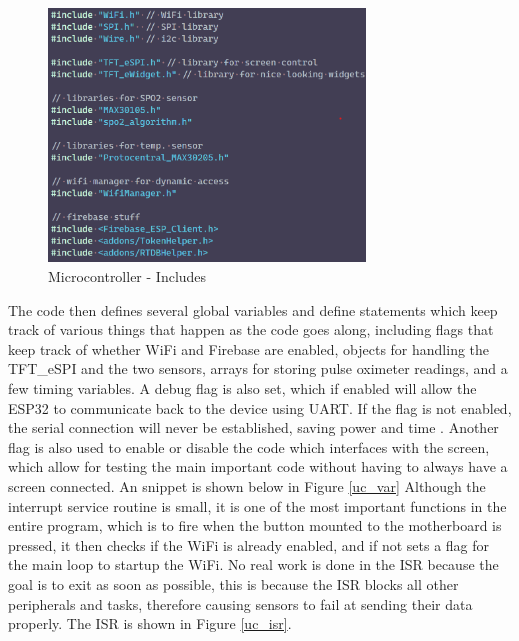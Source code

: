 \documentclass[12pt]{article}
\begin{document}
    \begin{figure}[ht]
        \centering
        \includegraphics[width=0.75\textwidth]{uc_libs}
        \caption{Microcontroller - Includes}
        \label{uc_lib}
    \end{figure} 

    The code then defines several global variables and define statements which keep track of various things that happen as the code goes along, including flags that keep track of whether WiFi and Firebase are enabled, objects for handling the TFT\_eSPI and the two sensors, arrays for storing pulse oximeter readings, and a few timing variables. A debug flag is also set, which if enabled will allow the ESP32 to communicate back to the device using UART. If the flag is not enabled, the serial connection will never be established, saving power and time \cite{esp32}. Another flag is also used to enable or disable the code which interfaces with the screen, which allow for testing the main important code without having to always have a screen connected. An snippet is shown below in Figure \ref{uc_var} Although the interrupt service routine is small, it is one of the most important functions in the entire program, which is to fire when the button mounted to the motherboard is pressed, it then checks if the WiFi is already enabled, and if not sets a flag for the main loop to startup the WiFi. No real work is done in the ISR because the goal is to exit as soon as possible, this is because the ISR blocks all other peripherals and tasks, therefore causing sensors to fail at sending their data properly. The ISR is shown in Figure \ref{uc_isr}.
\end{document}
